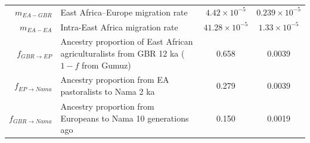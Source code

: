 \documentclass[]{article}
\begin{document}
\begin{table}[ht]
\begin{tabular}[t]{rP{8cm}cc}
    $m_{EA-GBR}$ & East Africa--Europe migration rate & $4.42\times10^{-5}$ & $0.239\times10^{-5}$ \\
    $m_{EA-EA}$ & Intra-East Africa migration rate & $41.28\times10^{-5}$ & $1.33\times10^{-5}$ \\
    $f_{GBR \rightarrow EP}$ & Ancestry proportion of East African agriculturalists from GBR 12 ka ($1-f$ from Gumuz) & 0.658 & 0.0039 \\
    $f_{EP \rightarrow Nama}$ & Ancestry proportion from EA pastoralists to Nama 2 ka & 0.279 & 0.0039 \\
    $f_{GBR \rightarrow Nama}$ & Ancestry proportion from Europeans to Nama 10 generations ago & 0.150 & 0.0019 \\
    \bottomrule
\end{tabular}
\end{table}
\end{document}
